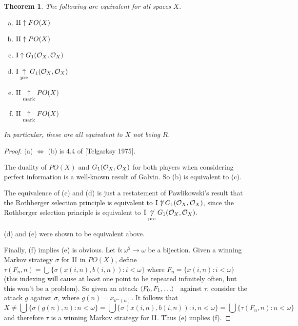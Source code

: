 \documentclass[11pt]{article}
\theoremstyle{plain}
\newtheorem{theorem}{Theorem}
\theoremstyle{definition}
\theoremstyle{remark}
\theoremstyle{plain}
\theoremstyle{definition}
\theoremstyle{remark}
\begin{document}
\begin{theorem}
The following are equivalent for all spaces \(X\).
\begin{enumerate}[a)]
\item \(\mathrm{II}\uparrow FO(X)\)
\item \(\mathrm{II}\uparrow PO(X)\)
\item \(\mathrm{I}\uparrow G_1(\mathcal{O}_{X},\mathcal{O}_{X})\)
\item \(\mathrm{I}\underset{\text{pre}}{\uparrow} G_1(\mathcal{O}_{X},\mathcal{O}_{X})\)
\item \(\mathrm{II}\underset{\text{mark}}{\uparrow} PO(X)\)
\item \(\mathrm{II}\underset{\text{mark}}{\uparrow} FO(X)\)
\end{enumerate}
In particular, these are all equivalent to \(X\) not being \(R\).
\end{theorem}
\begin{proof}
(a) \(\Leftrightarrow\) (b) is 4.4 of [Telgarksy 1975].

The duality of \(PO(X)\) and \(G_1(\mathcal{O}_{X},\mathcal{O}_{X})\) for both players
when considering perfect information is a well-known result of Galvin.
So (b) is equivalent to (c).

The equivalence of (c) and (d) is just a restatement of Pawlikowski's
result that the Rothberger selection principle is equivalent
to \(\mathrm{I}\not\uparrow G_1(\mathcal{O}_{X},\mathcal{O}_{X})\), since the Rothberger selection principle
is equivalent to \(\mathrm{I}\underset{\text{pre}}{\not\uparrow}G_1(\mathcal{O}_{X},\mathcal{O}_{X})\).

(d) and (e) were shown to be equivalent above.

Finally, (f) implies (e) is obvious. 
Let \(b:\omega^2\to\omega\) be a bijection.
Given a winning Markov strategy \(\sigma\) for \(\mathrm{II}\) in \(PO(X)\),
define \(\tau(F_n,n)=\bigcup\{\sigma(x(i,n),b(i,n)):i<\omega\}\)
where \(F_n=\{x(i,n):i<\omega\}\) (this indexing will cause at least one 
point to be repeated infinitely often, but this won't be a problem). 
So given an attack \(\<F_0,F_1,\dots\>\) \
against \(\tau\), consider the attack \(g\) against \(\sigma\), 
where \(g(n)=x_{b^{\leftarrow}(n)}\). It follows that
\[
  X
    \not=
  \bigcup\{\sigma(g(n),n):n<\omega\}
    =
  \bigcup\{\sigma(x(i,n),b(i,n)):i,n<\omega\}
    =
  \bigcup\{\tau(F_n,n):n<\omega\}
\]
and therefore \(\tau\) is a winning Markov strategy for \(\mathrm{II}\).
Thus (e) implies (f).
\end{proof}
\end{document}
